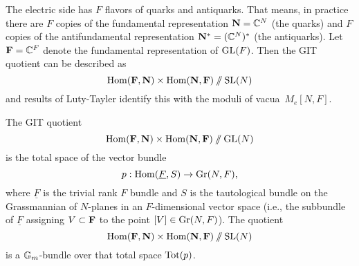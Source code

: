 \documentclass[11pt]{amsart}
\begin{document}
The electric side has $F$ flavors of quarks and antiquarks. 
That means, in practice there are $F$ copies of the fundamental representation $\mathbf N = \mathbb C^N$
(the quarks) 
and $F$ copies of the antifundamental representation $\mathbf N^* = (\mathbb C^N)^*$ (the antiquarks). 
Let $\mathbf F = \mathbb C^F$ denote the fundamental representation of $\operatorname{GL}(F)$.
Then the GIT quotient can be described as
\[
{\rm Hom}(\mathbf F, \mathbf N) \times {\rm Hom}(\mathbf N,\mathbf F)\mathbin{/\mkern-6mu/} \operatorname{SL}(N)
\]
and results of Luty-Tayler identify this with the moduli of vacua~$M_e[N,F]$.

\begin{prop}
The GIT quotient 
\[
{\rm Hom}(\mathbf F, \mathbf N) \times {\rm Hom}(\mathbf N,\mathbf F)\mathbin{/\mkern-6mu/} \operatorname{GL}(N)
\]
is the total space of the vector bundle
\[
p: {\rm Hom}(\underline{F}, S) \to {\rm Gr}(N,F),
\]
where $\underline{F}$ is the trivial rank $F$ bundle and $S$ is the tautological bundle on the Grassmannian of $N$-planes in an $F$-dimensional vector space
(i.e., the subbundle of $\underline{F}$ assigning $V \subset \mathbf F$ to the point $[V] \in {\rm Gr}(N,F)$).
The quotient
\[
{\rm Hom}(\mathbf F, \mathbf N) \times {\rm Hom}(\mathbf N,\mathbf F)\mathbin{/\mkern-6mu/} \operatorname{SL}(N)
\]
is a $\mathbb G_m$-bundle over that total space $\operatorname{Tot}(p)$.
\end{prop}
\end{document}
